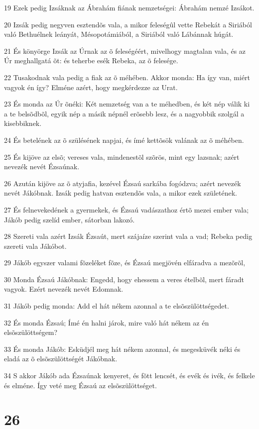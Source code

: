 \par 19 Ezek pedig Izsáknak az Ábrahám fiának nemzetségei: Ábrahám nemzé Izsákot.
\par 20 Izsák pedig negyven esztendõs vala, a mikor feleségûl vette Rebekát a Siriából való Bethuélnek leányát, Mésopotámiából, a Siriából való Lábánnak húgát.
\par 21 És könyörge Izsák az Úrnak az õ feleségéért, mivelhogy magtalan vala, és az Úr meghallgatá õt: és teherbe esék Rebeka, az õ felesége.
\par 22 Tusakodnak vala pedig a fiak az õ méhében. Akkor monda: Ha így van, miért vagyok én így? Elméne azért, hogy megkérdezze az Urat.
\par 23 És monda az Úr õnéki: Két nemzetség van a te méhedben, és két nép válik ki a te belsõdbõl, egyik nép a másik népnél erõsebb lesz, és a nagyobbik szolgál a kisebbiknek.
\par 24 És betelének az õ szülésének napjai, és ímé kettõsök valának az õ méhében.
\par 25 És kijöve az elsõ; vereses vala, mindenestõl szõrös, mint egy lazsnak; azért nevezék nevét Ézsaúnak.
\par 26 Azután kijöve az õ atyjafia, kezével Ézsaú sarkába fogódzva; azért nevezék nevét Jákóbnak. Izsák pedig hatvan esztendõs vala, a mikor ezek születének.
\par 27 És felnevekedének a gyermekek, és Ézsaú vadászathoz értõ mezei ember vala; Jákób pedig szelíd ember, sátorban lakozó.
\par 28 Szereti vala azért Izsák Ézsaút, mert szájaíze szerint vala a vad; Rebeka pedig szereti vala Jákóbot.
\par 29 Jákób egyszer valami fõzeléket fõze, és Ézsaú megjövén elfáradva a mezõrõl,
\par 30 Monda Ézsaú Jákóbnak: Engedd, hogy ehessem a veres ételbõl, mert fáradt vagyok. Ezért nevezék nevét Edomnak.
\par 31 Jákób pedig monda: Add el hát nékem azonnal a te elsõszülöttségedet.
\par 32 És monda Ézsaú; Ímé én halni járok, mire való hát nékem az én elsõszülöttségem?
\par 33 És monda Jákób: Esküdjél meg hát nékem azonnal, és megesküvék néki és eladá az õ elsõszülöttségét Jákóbnak.
\par 34 S akkor Jákób ada Ézsaúnak kenyeret, és fõtt lencsét, és evék és ivék, és felkele és elméne. Így veté meg Ézsaú az elsõszülöttséget.

\chapter{26}

